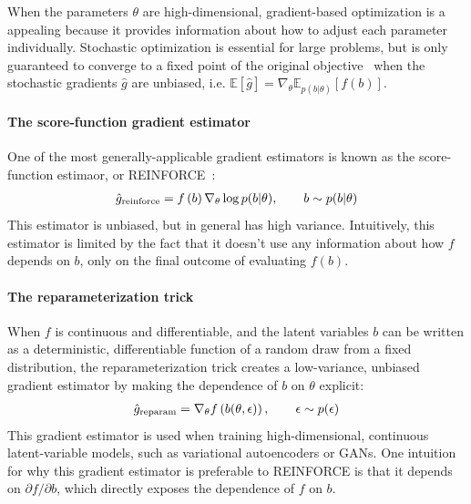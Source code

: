 \documentclass{article}
\begin{document}
When the parameters $\theta$ are high-dimensional, gradient-based optimization is a appealing because it provides information about how to adjust each parameter individually.
Stochastic optimization is essential for large problems, but is only guaranteed to converge to a fixed point of the original objective~\citep{robbins1951stochastic} when the stochastic gradients $\hat g$ are unbiased, i.e. ${\mathbb{E} \left[ \hat g \right] = \nabla_\theta \mathbb{E}_{p(b|\theta)} \left[ f(b) \right]}$.

\paragraph{The score-function gradient estimator}
One of the most generally-applicable gradient estimators is known as the score-function estimaor, or REINFORCE~\citep{williams1992simple}:
%
\begin{align}
\hat g_\textnormal{reinforce} =  f \left( b \right) \nabla_\theta \log p(b | \theta), \qquad b \sim p(b | \theta)
\end{align}
%
This estimator is unbiased, but in general has high variance.
Intuitively, this estimator is limited by the fact that it doesn't use any information about how $f$ depends on $b$, only on the final outcome of evaluating $f(b)$.

\paragraph{The reparameterization trick}
When $f$ is continuous and differentiable, and the latent variables $b$ can be written as a deterministic, differentiable function of a random draw from a fixed distribution, the reparameterization trick \citep{williams1992simple, kingma2013autoencoding, rezende2014stochastic} creates a low-variance, unbiased gradient estimator by making the dependence of $b$ on $\theta$ explicit:
%
\begin{align}
\hat g_\textnormal{reparam} = \nabla_\theta f \left( b(\theta, \epsilon) \right), \qquad \epsilon \sim p(\epsilon)
\end{align}
%
This gradient estimator is used when training high-dimensional, continuous latent-variable models, such as variational autoencoders or GANs.
One intuition for why this gradient estimator is preferable to REINFORCE is that it depends on $\partial f / \partial b$, which directly exposes the dependence of $f$ on $b$.
\end{document}
